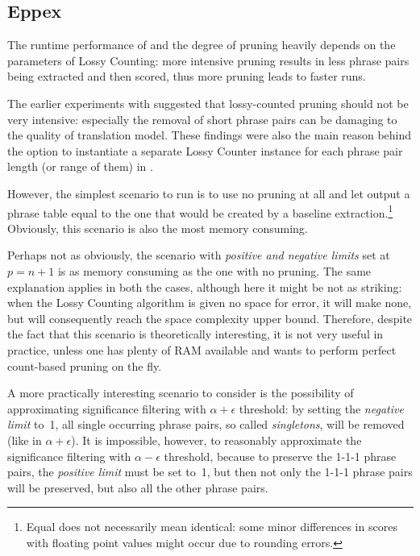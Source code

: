\subsection{Eppex}

The runtime performance of \eppex{} and the degree of pruning heavily depends
on the parameters of Lossy Counting: more intensive pruning results in less phrase pairs
being extracted and then scored, thus more pruning leads to faster \eppex{} runs.

The earlier experiments with \eppex{} \citep{przywara:eppex} suggested that lossy-counted
pruning should not be very intensive: especially the removal of short phrase pairs can be
damaging to the quality of translation model.
These findings were also the main reason behind the option to instantiate a separate
Lossy Counter instance for each phrase pair length (or range of them) in \eppex{}.

However, the simplest scenario to run is to use no pruning at all and let \eppex{} output
a phrase table equal to the one that would be created by a baseline extraction.\footnote{Equal
does not necessarily mean identical: some minor differences in scores with floating point
values might occur due to rounding errors.}
Obviously, this scenario is also the most memory consuming.

Perhaps not as obviously, the scenario with \emph{positive and negative limits} set at
$p = n + 1$ is as memory consuming as the one with no pruning.
The same explanation applies in both the cases, although here it might be not as striking:
when the Lossy Counting algorithm is given no space for error, it will make none,
but will consequently reach the space complexity upper bound.
Therefore, despite the fact that this scenario is theoretically interesting, it is not very
useful in practice, unless one has plenty of RAM available and wants to perform perfect
count-based pruning on the fly.

A more practically interesting scenario to consider is the possibility of approximating
significance filtering with $\alpha + \epsilon$ threshold:
by setting the \emph{negative limit} to~1, all single occurring phrase pairs,
so called \emph{singletons}, will be removed (like in $\alpha + \epsilon$).
It is impossible, however, to reasonably approximate the significance filtering
with $\alpha - \epsilon$ threshold, because to preserve the 1-1-1 phrase pairs,
the \emph{positive limit} must be set to~1, but then not only the 1-1-1 phrase pairs
will be preserved, but also all the other phrase pairs.

